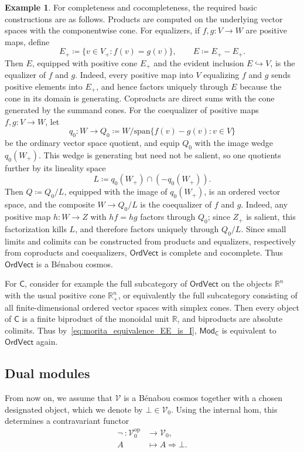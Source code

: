 \documentclass[11pt,onecolumn]{article}
\newcommand{\R}{\mathbb{R}}
\newcommand{\cV}{\mathscr{V}}
\newcommand{\cC}{\mathsf{C}}
\newcommand{\op}{\mathrm{op}}
\newcommand{\Mod}{\mathsf{Mod}}
\newcommand{\OrdVect}{\mathsf{OrdVect}}
\theoremstyle{plain}
\theoremstyle{remark}
\theoremstyle{definition}
\newtheorem{example}[example]{Example}
\begin{document}
\begin{example}
	For completeness and cocompleteness, the required basic constructions are as follows.
	Products are computed on the underlying vector spaces with the componentwise cone.
	For equalizers, if $f,g \colon V \to W$ are positive maps, define
	\[
		E_+ \coloneqq \{v \in V_+ : f(v)=g(v)\}, \qquad E \coloneqq E_+ - E_+.
	\]
	Then $E$, equipped with positive cone $E_+$ and the evident inclusion $E \hookrightarrow V$, is the equalizer of $f$ and $g$.
	Indeed, every positive map into $V$ equalizing $f$ and $g$ sends positive elements into $E_+$, and hence factors uniquely through $E$ because the cone in its domain is generating.
	Coproducts are direct sums with the cone generated by the summand cones.
	For the coequalizer of positive maps $f,g \colon V \to W$, let
	\[
		q_0 \colon W \longrightarrow Q_0 \coloneqq W / \mathrm{span}\{f(v)-g(v):v\in V\}
	\]
	be the ordinary vector space quotient, and equip $Q_0$ with the image wedge $q_0(W_+)$.
	This wedge is generating but need not be salient, so one quotients further by its lineality space
	\[
		L \coloneqq q_0(W_+) \cap (-q_0(W_+)).
	\]
	Then $Q \coloneqq Q_0/L$, equipped with the image of $q_0(W_+)$, is an ordered vector space, and the composite $W \to Q_0/L$ is the coequalizer of $f$ and $g$.
	Indeed, any positive map $h \colon W \to Z$ with $hf = hg$ factors through $Q_0$; since $Z_+$ is salient, this factorization kills $L$,
	and therefore factors uniquely through $Q_0/L$.
	Since small limits and colimits can be constructed from products and equalizers, respectively from coproducts and coequalizers, $\OrdVect$ is complete and cocomplete.
	Thus $\OrdVect$ is a B\'enabou cosmos.

	For $\cC$, consider for example the full subcategory of $\OrdVect$ on the objects $\R^n$ with the usual positive cone $\R^n_+$,
	or equivalently the full subcategory consisting of all finite-dimensional ordered vector spaces with simplex cones.
	Then every object of $\cC$ is a finite biproduct of the monoidal unit $\R$, and biproducts are absolute colimits.
	Thus by~\eqref{eq:morita_equivalence_EE_is_I}, $\Mod_\cC$ is equivalent to $\OrdVect$ again.
\end{example}

\subsection{Dual modules} 

From now on, we assume that $\cV$ is a B\'enabou cosmos together with a chosen designated object, which we denote by $\bot \in \cV_0$.
Using the internal hom, this determines a contravariant functor
\begin{align*}
	\neg \: \colon \cV_0^\op & \longrightarrow \cV_0, \\
	A & \longmapsto A \Rightarrow \bot.
\end{align*}
\end{document}
